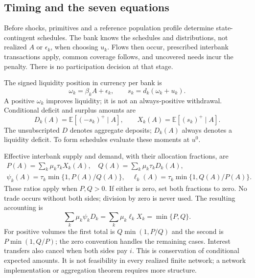 \documentclass[11pt]{article}
\theoremstyle{definition}
\newcommand{\E}{\mathbb E}
\begin{document}
\subsection{Timing and the seven equations}
Before shocks, primitives and a reference population profile determine state-contingent schedules. The bank knows the schedules and distributions, not realized $A$ or $\epsilon_k$, when choosing $u_k$. Flows then occur, prescribed interbank transactions apply, common coverage follows, and uncovered needs incur the penalty. There is no participation decision at that stage.

The signed liquidity position in currency per bank is
\begin{equation}\label{eq:flow}
 \omega_k=\beta_kA+\epsilon_k,\qquad s_k=d_k(\omega_k+u_k).
\end{equation}
A positive $\omega_k$ improves liquidity; it is not an always-positive withdrawal. Conditional deficit and surplus amounts are
\begin{equation}\label{eq:moments}
 D_k(A)=\E[(-s_k)^+\mid A],\qquad X_k(A)=\E[(s_k)^+\mid A].
\end{equation}
The unsubscripted $D$ denotes aggregate deposits; $D_k(A)$ always denotes a liquidity deficit. To form schedules evaluate these moments at $u^0$.

Effective interbank supply and demand, with their allocation fractions, are
\begin{equation}\label{eq:market}
\begin{gathered}
 P(A)=\sum_k\mu_k\tau_kX_k(A),\quad Q(A)=\sum_k\mu_k\tau_kD_k(A),\\
 \psi_k(A)=\tau_k\min\{1,P(A)/Q(A)\},\quad
 \ell_k(A)=\tau_k\min\{1,Q(A)/P(A)\}.
\end{gathered}
\end{equation}
These ratios apply when $P,Q>0$. If either is zero, set both fractions to zero. No trade occurs without both sides; division by zero is never used. The resulting accounting is
\begin{equation}\label{eq:conservation}
 \sum_k\mu_k\psi_kD_k=\sum_k\mu_k\ell_kX_k=\min\{P,Q\}.
\end{equation}
For positive volumes the first total is $Q\min(1,P/Q)$ and the second is $P\min(1,Q/P)$; the zero convention handles the remaining cases. Interest transfers also cancel when both sides pay $i$. This is conservation of conditional expected amounts. It is not feasibility in every realized finite network; a network implementation or aggregation theorem requires more structure.
\end{document}
